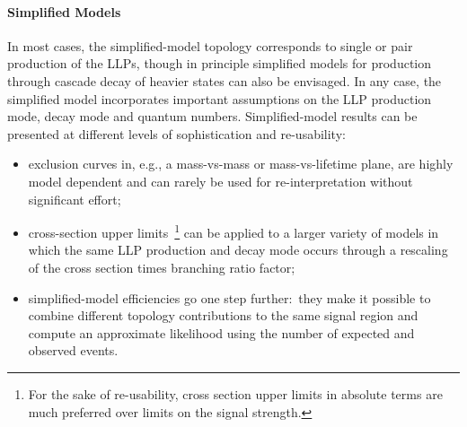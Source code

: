 \paragraph{Simplified Models}%
In most cases, the simplified-model topology corresponds to single or pair
production of the LLPs, though in principle simplified models for production
through cascade decay of heavier states can also be envisaged.
In any case, the simplified model incorporates important assumptions
on the LLP production mode, decay mode and quantum numbers.
Simplified-model results can be presented at different levels of sophistication and re-usability:
\begin{itemize}
\item exclusion curves in, e.g., a mass-vs-mass or mass-vs-lifetime plane, are highly model dependent and can
rarely be used for re-interpretation without significant effort;
\item cross-section upper limits~\footnote{For the sake of re-usability, cross section upper limits in absolute terms are much preferred over limits on the signal strength.}
can be applied to a larger variety of models
in which the same LLP production and decay mode occurs
through a rescaling of the cross section times branching
ratio factor;
\item simplified-model efficiencies go one step further:~they make
it possible to combine different topology contributions to the same signal
region and compute an approximate likelihood using the number of expected and
observed events.
\end{itemize}

